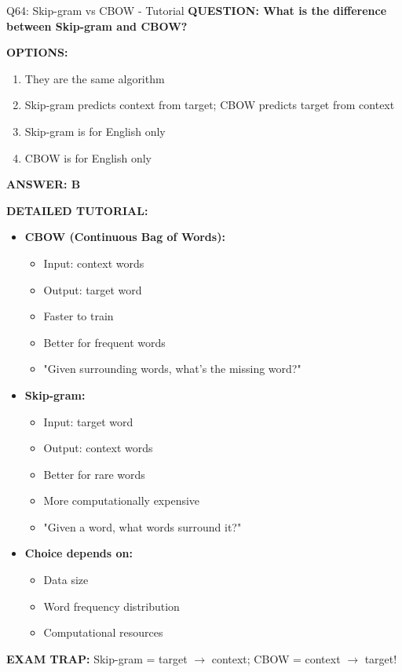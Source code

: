 \documentclass[8pt]{beamer}
\begin{document}
	\begin{frame}{Q64: Skip-gram vs CBOW - Tutorial}
		\fontsize{6.5}{7.5}\selectfont
		\textbf{QUESTION: What is the difference between Skip-gram and CBOW?}
		
		\vspace{0.1cm}
		\textbf{OPTIONS:}
		\begin{enumerate}
			\item They are the same algorithm
			\item Skip-gram predicts context from target; CBOW predicts target from context
			\item Skip-gram is for English only
			\item CBOW is for English only
		\end{enumerate}
		
		\vspace{0.1cm}
		\textcolor{myblue}{\textbf{ANSWER: B}}
		
		\vspace{0.1cm}
		\textbf{DETAILED TUTORIAL:}
		\begin{itemize}
			\item \textbf{CBOW (Continuous Bag of Words):}
			\begin{itemize}
				\item Input: context words
				\item Output: target word
				\item Faster to train
				\item Better for frequent words
				\item "Given surrounding words, what's the missing word?"
			\end{itemize}
			\item \textbf{Skip-gram:}
			\begin{itemize}
				\item Input: target word
				\item Output: context words
				\item Better for rare words
				\item More computationally expensive
				\item "Given a word, what words surround it?"
			\end{itemize}
			\item \textbf{Choice depends on:}
			\begin{itemize}
				\item Data size
				\item Word frequency distribution
				\item Computational resources
			\end{itemize}
		\end{itemize}
		
		\textcolor{myred}{\textbf{EXAM TRAP:}} Skip-gram = \textcolor{myblue}{target $\to$ context}; CBOW = \textcolor{myblue}{context $\to$ target}!
	\end{frame}
	
\end{document}
